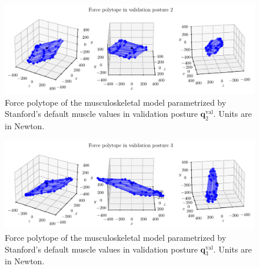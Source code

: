 \begin{figure}[!htb]
    \centering
    \captionsetup{justification=centering}
    \begin{minipage}{\linewidth}
        \centering
        \includegraphics[trim={0 0 0 0}, clip, width=1\linewidth]{img/chapter_4/reconstruction_stanford_imgs/STANFORD_POSTURE_VAL_02.pdf}
    \end{minipage}
    \caption{Force polytope of the musculoskeletal model parametrized by Stanford's default muscle values in validation posture $\mathbf{q}_2^{\text{val}}$. Units are in Newton.}
    \label{fig:polytope_val_pose_2}
\end{figure}

\begin{figure}[!htb]
    \centering
    \captionsetup{justification=centering}
    \begin{minipage}{\linewidth}
        \centering
        \includegraphics[trim={0 0 0 0}, clip, width=1\linewidth]{img/chapter_4/reconstruction_stanford_imgs/STANFORD_POSTURE_VAL_03.pdf}
    \end{minipage}
    \caption{Force polytope of the musculoskeletal model parametrized by Stanford's default muscle values in validation posture $\mathbf{q}_3^{\text{val}}$. Units are in Newton.}
    \label{fig:polytope_val_pose_3}
\end{figure}

